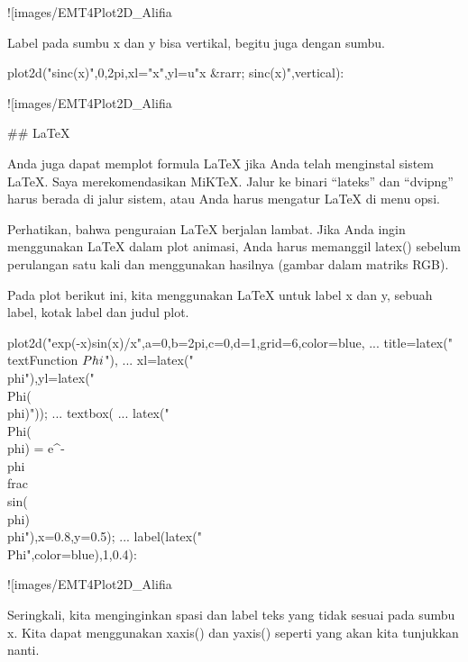 \documentclass{article}
\begin{document}
![images/EMT4Plot2D_Alifia%

Label pada sumbu x dan y bisa vertikal, begitu juga dengan sumbu.


\>plot2d("sinc(x)",0,2pi,xl="x",yl=u"x &rarr; sinc(x)",\>vertical):


![images/EMT4Plot2D_Alifia%

## LaTeX

Anda juga dapat memplot formula LaTeX jika Anda telah menginstal
sistem LaTeX. Saya merekomendasikan MiKTeX. Jalur ke binari “lateks”
dan “dvipng” harus berada di jalur sistem, atau Anda harus mengatur
LaTeX di menu opsi.


Perhatikan, bahwa penguraian LaTeX berjalan lambat. Jika Anda ingin
menggunakan LaTeX dalam plot animasi, Anda harus memanggil latex()
sebelum perulangan satu kali dan menggunakan hasilnya (gambar dalam
matriks RGB).


Pada plot berikut ini, kita menggunakan LaTeX untuk label x dan y,
sebuah label, kotak label dan judul plot.


\>plot2d("exp(-x)\*sin(x)/x",a=0,b=2pi,c=0,d=1,grid=6,color=blue, ...  
\>     title=latex("\\text{Function $\\Phi$}"), ...  
\>     xl=latex("\\phi"),yl=latex("\\Phi(\\phi)")); ...  
\>   textbox( ...  
\>     latex("\\Phi(\\phi) = e^{-\\phi} \\frac{\\sin(\\phi)}{\\phi}"),x=0.8,y=0.5); ...  
\>   label(latex("\\Phi",color=blue),1,0.4):


![images/EMT4Plot2D_Alifia%

Seringkali, kita menginginkan spasi dan label teks yang tidak sesuai
pada sumbu x. Kita dapat menggunakan xaxis() dan yaxis() seperti yang
akan kita tunjukkan nanti.
\end{document}
